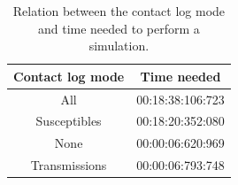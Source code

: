 \documentclass[runningheads]{llncs}
\begin{document}
\begin{table}
	\caption{Relation between the contact log mode and time needed to perform a simulation.}
	\begin{center}
		\begin{tabular}{ | c | c |}
			\hline
			Contact log mode & Time needed \\ \hline
			All & 00:18:38:106:723 \\ \hline
			Susceptibles & 00:18:20:352:080 \\ \hline
			None & 00:00:06:620:969 \\ \hline
			Transmissions & 00:00:06:793:748 \\
			\hline	
		\end{tabular}
	\end{center}
\end{table}
\end{document}
